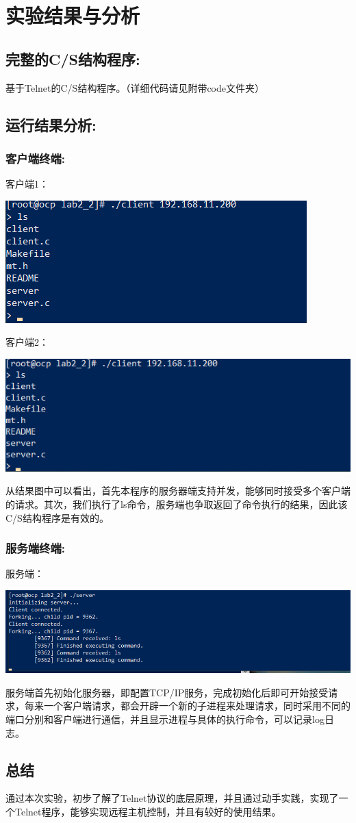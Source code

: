 \documentclass[UTF8]{ctexart}
\begin{document}
\section{实验结果与分析}
\subsection{完整的C/S结构程序:}{基于Telnet的C/S结构程序。（详细代码请见附带code文件夹）}
\subsection{运行结果分析:}
\subsubsection{客户端终端:}
\par{客户端1：}
\par\centerline{\includegraphics[scale=0.6]{client1}}
\par{客户端2：}
\par\centerline{\includegraphics[scale=0.6]{client2}}
\par{从结果图中可以看出，首先本程序的服务器端支持并发，能够同时接受多个客户端的请求。其次，我们执行了ls命令，服务端也争取返回了命令执行的结果，因此该C/S结构程序是有效的。}
\subsubsection{服务端终端:}
\par{服务端：}
\par\centerline{\includegraphics[scale=0.6]{server}}
\par{服务端首先初始化服务器，即配置TCP/IP服务，完成初始化后即可开始接受请求，每来一个客户端请求，都会开辟一个新的子进程来处理请求，同时采用不同的端口分别和客户端进行通信，并且显示进程与具体的执行命令，可以记录log日志。}
\subsection{总结}
\par{通过本次实验，初步了解了Telnet协议的底层原理，并且通过动手实践，实现了一个Telnet程序，能够实现远程主机控制，并且有较好的使用结果。}
\end{document}
